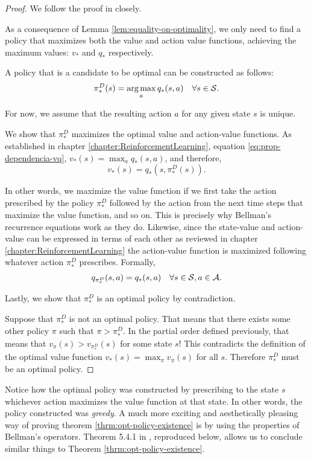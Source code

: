 \begin{proof}
    We follow the proof in \cite[pg.~115]{raoRL4F} closely.

    As a consequence of Lemma \ref{lem:equality-on-optimality}, we only need to
    find a policy that maximizes both the value and action value functions,
    achieving the maximum values: $v_*$ and $q_*$ respectively.

    A policy that is a candidate to be optimal can be constructed as follows:
    \[
        \pi_{*}^{D} (s) = \operatorname*{arg\,max}_{a} q_{*} (s, a) \quad \forall s \in \mathcal{S}.
    \]

    For now, we assume that the resulting action $a$ for any given state $s$ is
    unique.

    We show that $\pi_{*}^{D}$ maximizes the optimal value and action-value
    functions. As established in chapter \ref{chapter:ReinforcementLearning},
    equation \eqref{eq:prop-dependencia-vq}, $v_* (s) = \max_a q_* (s, a)$, and
    therefore,
    \[
        v_* (s) = q_* (s, \pi_{*}^{D}(s)).
    \]

    In other words, we maximize the value function if we first take the action
    prescribed by the policy $\pi_{*}^{D}$ followed by the action from the next
    time steps that maximize the value function, and so on. This is precisely
    why Bellman's recurrence equations work as they do. Likewise, since the
    state-value and action-value can be expressed in terms of each other as
    reviewed in chapter \ref{chapter:ReinforcementLearning} the action-value
    function is maximized following whatever action $\pi_{*}^{D}$ prescribes.
    Formally,
    \[
        q_{\pi_{*}^{D}} (s, a) = q_* (s,a) \quad \forall s \in \mathcal{S}, a \in \mathcal{A}.
    \]

    Lastly, we show that $\pi_{*}^{D}$ is an optimal policy by contradiction.

    Suppose that $\pi_{*}^{D}$ is not an optimal policy. That means that there
    exists some other policy $\pi$ such that $\pi > \pi_{*}^{D}$. In the partial
    order defined previously, that means that $v_{\pi} (s) > v_{\pi_{*}^{D}}
    (s)$ for some state $s$! This contradicts the definition of the
    optimal value function $v_* (s) = \max_\pi v_\pi (s)$ for all $s$. Therefore
    $\pi_{*}^{D}$ must be an optimal policy.
\end{proof}

Notice how the optimal policy was constructed by prescribing to the state $s$
whichever action maximizes the value function at that state. In other words, the
policy constructed was \emph{greedy}. A much more exciting and aesthetically
pleasing way of proving theorem \ref{thrm:opt-policy-existence} is by using the
properties of Bellman's operators. Theorem 5.4.1 in \cite[pg.~130]{raoRL4F},
reproduced below, allows us to conclude similar things to Theorem
\ref{thrm:opt-policy-existence}.

